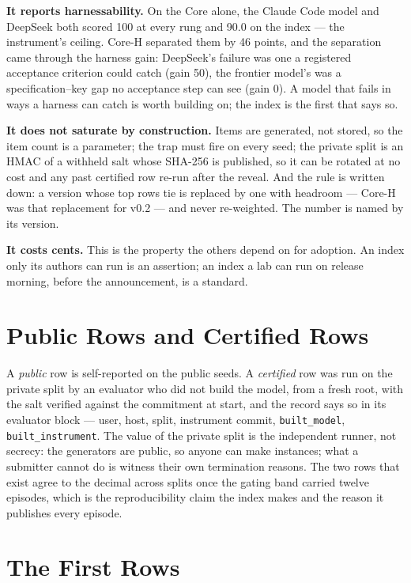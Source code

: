 \textbf{It reports harnessability.} On the Core alone, the Claude Code model and DeepSeek both scored 100 at every rung and 90.0 on the index --- the instrument's ceiling. Core-H separated them by 46 points, and the separation came through the harness gain: DeepSeek's failure was one a registered acceptance criterion could catch (gain 50), the frontier model's was a specification--key gap no acceptance step can see (gain 0). A model that fails in ways a harness can catch is worth building on; the index is the first that says so.

\textbf{It does not saturate by construction.} Items are generated, not stored, so the item count is a parameter; the trap must fire on every seed; the private split is an HMAC of a withheld salt whose SHA-256 is published, so it can be rotated at no cost and any past certified row re-run after the reveal. And the rule is written down: a version whose top rows tie is replaced by one with headroom --- Core-H was that replacement for v0.2 --- and never re-weighted. The number is named by its version.

\textbf{It costs cents.} This is the property the others depend on for adoption. An index only its authors can run is an assertion; an index a lab can run on release morning, before the announcement, is a standard.

\section{Public Rows and Certified Rows}\label{sec:rows}

A \emph{public} row is self-reported on the public seeds. A \emph{certified} row was run on the private split by an evaluator who did not build the model, from a fresh root, with the salt verified against the commitment at start, and the record says so in its evaluator block --- user, host, split, instrument commit, \texttt{built\_model}, \texttt{built\_instrument}. The value of the private split is the independent runner, not secrecy: the generators are public, so anyone can make instances; what a submitter cannot do is witness their own termination reasons. The two rows that exist agree to the decimal across splits once the gating band carried twelve episodes, which is the reproducibility claim the index makes and the reason it publishes every episode.

\section{The First Rows}\label{sec:first}

